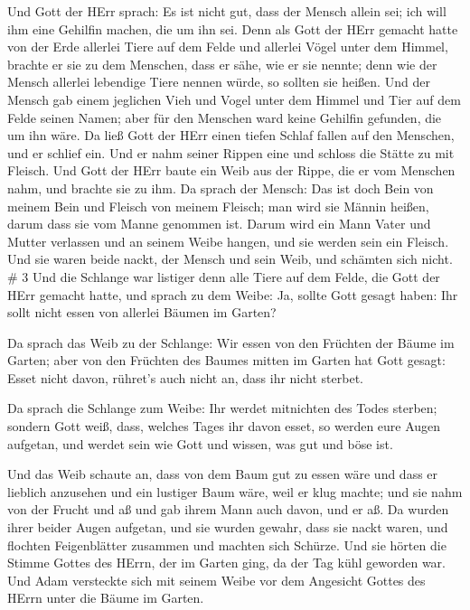  Und Gott der HErr sprach: Es ist nicht gut, dass der
Mensch allein sei; ich will ihm eine Gehilfin machen, die um ihn sei.
 Denn als Gott der HErr gemacht hatte von der Erde allerlei
Tiere auf dem Felde und allerlei Vögel unter dem Himmel, brachte er sie
zu dem Menschen, dass er sähe, wie er sie nennte; denn wie der Mensch
allerlei lebendige Tiere nennen würde, so sollten sie heißen.
 Und der Mensch gab einem jeglichen Vieh und Vogel unter
dem Himmel und Tier auf dem Felde seinen Namen; aber für den Menschen
ward keine Gehilfin gefunden, die um ihn wäre.  Da ließ
Gott der HErr einen tiefen Schlaf fallen auf den Menschen, und er
schlief ein. Und er nahm seiner Rippen eine und schloss die Stätte zu
mit Fleisch.  Und Gott der HErr baute ein Weib aus der
Rippe, die er vom Menschen nahm, und brachte sie zu ihm. 
Da sprach der Mensch: Das ist doch Bein von meinem Bein und Fleisch von
meinem Fleisch; man wird sie Männin heißen, darum dass sie vom Manne
genommen ist.  Darum wird ein Mann Vater und Mutter
verlassen und an seinem Weibe hangen, und sie werden sein ein Fleisch.
 Und sie waren beide nackt, der Mensch und sein Weib, und
schämten sich nicht. \# 3  Und die Schlange war listiger
denn alle Tiere auf dem Felde, die Gott der HErr gemacht hatte, und
sprach zu dem Weibe: Ja, sollte Gott gesagt haben: Ihr sollt nicht essen
von allerlei Bäumen im Garten?

 Da sprach das Weib zu der Schlange: Wir essen von den
Früchten der Bäume im Garten;  aber von den Früchten des
Baumes mitten im Garten hat Gott gesagt: Esset nicht davon, rühret's
auch nicht an, dass ihr nicht sterbet.

 Da sprach die Schlange zum Weibe: Ihr werdet mitnichten des
Todes sterben;  sondern Gott weiß, dass, welches Tages ihr
davon esset, so werden eure Augen aufgetan, und werdet sein wie Gott und
wissen, was gut und böse ist.

 Und das Weib schaute an, dass von dem Baum gut zu essen
wäre und dass er lieblich anzusehen und ein lustiger Baum wäre, weil er
klug machte; und sie nahm von der Frucht und aß und gab ihrem Mann auch
davon, und er aß.  Da wurden ihrer beider Augen aufgetan,
und sie wurden gewahr, dass sie nackt waren, und flochten Feigenblätter
zusammen und machten sich Schürze.  Und sie hörten die
Stimme Gottes des HErrn, der im Garten ging, da der Tag kühl geworden
war. Und Adam versteckte sich mit seinem Weibe vor dem Angesicht Gottes
des HErrn unter die Bäume im Garten.

